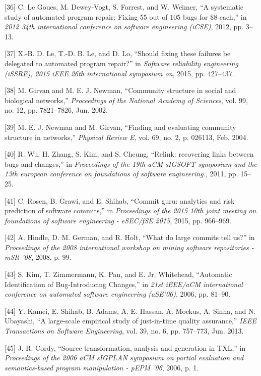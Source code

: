 \documentclass[conference]{IEEEtran}
\begin{document}
{[}36{]} C. {Le Goues}, M. Dewey-Vogt, S. Forrest, and W. Weimer, ``A
systematic study of automated program repair: Fixing 55 out of 105 bugs
for \$8 each,'' in \emph{2012 34th international conference on software
engineering (iCSE)}, 2012, pp. 3--13.

{[}37{]} X.-B. D. Le, T.-D. B. Le, and D. Lo, ``Should fixing these
failures be delegated to automated program repair?'' in \emph{Software
reliability engineering (iSSRE), 2015 iEEE 26th international symposium
on}, 2015, pp. 427--437.

{[}38{]} M. Girvan and M. E. J. Newman, ``Community structure in social
and biological networks,'' \emph{Proceedings of the National Academy of
Sciences}, vol. 99, no. 12, pp. 7821--7826, Jun. 2002.

{[}39{]} M. E. J. Newman and M. Girvan, ``Finding and evaluating
community structure in networks,'' \emph{Physical Review E}, vol. 69,
no. 2, p. 026113, Feb. 2004.

{[}40{]} R. Wu, H. Zhang, S. Kim, and S. Cheung, ``Relink: recovering
links between bugs and changes,'' in \emph{Proceedings of the 19th aCM
sIGSOFT symposium and the 13th european conference on foundations of
software engineering.}, 2011, pp. 15--25.

{[}41{]} C. Rosen, B. Grawi, and E. Shihab, ``Commit guru: analytics and
risk prediction of software commits,'' in \emph{Proceedings of the 2015
10th joint meeting on foundations of software engineering - eSEC/fSE
2015}, 2015, pp. 966--969.

{[}42{]} A. Hindle, D. M. German, and R. Holt, ``What do large commits
tell us?'' in \emph{Proceedings of the 2008 international workshop on
mining software repositories - mSR '08}, 2008, p. 99.

{[}43{]} S. Kim, T. Zimmermann, K. Pan, and E. {Jr. Whitehead},
``Automatic Identification of Bug-Introducing Changes,'' in \emph{21st
iEEE/aCM international conference on automated software engineering
(aSE'06)}, 2006, pp. 81--90.

{[}44{]} Y. Kamei, E. Shihab, B. Adams, A. E. Hassan, A. Mockus, A.
Sinha, and N. Ubayashi, ``A large-scale empirical study of just-in-time
quality assurance,'' \emph{IEEE Transactions on Software Engineering},
vol. 39, no. 6, pp. 757--773, Jun. 2013.

{[}45{]} J. R. Cordy, ``Source transformation, analysis and generation
in TXL,'' in \emph{Proceedings of the 2006 aCM sIGPLAN symposium on
partial evaluation and semantics-based program manipulation - pEPM '06},
2006, p. 1.
\end{document}
